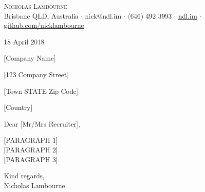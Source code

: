 \documentclass[a4paper]{scrlttr2}
\begin{document}
\vspace*{-50pt}

\begin{center}
	{\Huge \scshape {Nicholas Lambourne}}\\
	\vspace{3pt}
	\small Brisbane QLD, Australia $\cdot$ nick@ndl.im $\cdot$ (646) 492 3993 $\cdot$ \href{https://ndl.im}{ndl.im} $\cdot$ \href{https://github.com/nicklambourne}{github.com/nicklambourne}\\
	\hrulefill
\end{center}

\vspace{30pt}

18 April 2018

\vspace{40pt}

[Company Name]

[123 Company Street]

[Town STATE Zip Code]

[Country]

\vspace{40pt}

Dear [Mr/Mrs Recruiter],

\vspace{40pt}

[PARAGRAPH 1] \\

[PARAGRAPH 2] \\

[PARAGRAPH 3]

\vspace{40pt}

Kind regards, \\

Nicholas Lambourne
\end{document}
